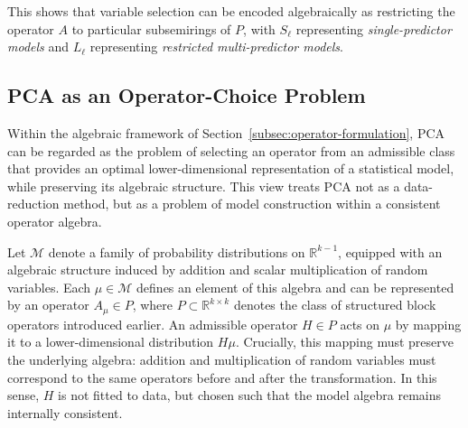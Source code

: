 This shows that variable selection can be encoded algebraically as restricting the operator $A$ to particular subsemirings of $P$, with $S_\ell$ representing \emph{single-predictor models} and $L_\ell$ representing \emph{restricted multi-predictor models}.

\subsection{PCA as an Operator-Choice Problem}
\label{subsec:pca-operator}

Within the algebraic framework of Section~\ref{subsec:operator-formulation}, PCA can be regarded as the problem of selecting an operator from an admissible class that provides an optimal lower-dimensional representation of a statistical model, while preserving its algebraic structure. This view treats PCA not as a data-reduction method, but as a problem of model construction within a consistent operator algebra.

Let $\mathcal{M}$ denote a family of probability distributions on $\mathbb{R}^{k-1}$, equipped with an algebraic structure induced by addition and scalar multiplication of random variables. Each $\mu \in \mathcal{M}$ defines an element of this algebra and can be represented by an operator $A_\mu \in P$, where $P \subset \mathbb{R}^{k \times k}$ denotes the class of structured block operators introduced earlier. An admissible operator $H \in P$ acts on $\mu$ by mapping it to a lower-dimensional distribution $H\mu$. Crucially, this mapping must preserve the underlying algebra: addition and multiplication of random variables must correspond to the same operators before and after the transformation. In this sense, $H$ is not fitted to data, but chosen such that the model algebra remains internally consistent.

